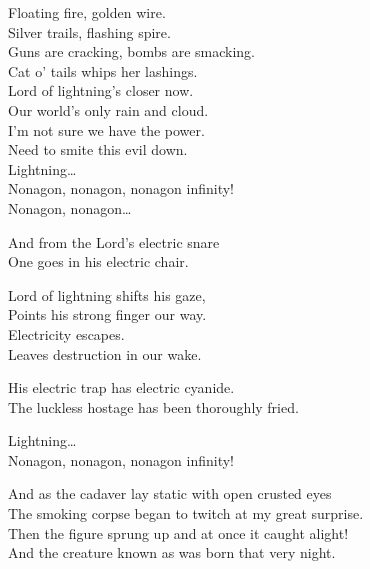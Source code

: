 
Floating fire, golden wire. \\
Silver trails, flashing spire. \\
Guns are cracking, bombs are smacking. \\
Cat o' tails whips her lashings. \\

Lord of lightning's closer now. \\
Our world's only rain and cloud. \\
I'm not sure we have the power. \\
Need to smite this evil down. \\

Lightning… \\

Nonagon, nonagon, nonagon infinity! \\
Nonagon, nonagon… \\


And from the Lord's electric snare \\
One goes in his electric chair. \\


Lord of lightning shifts his gaze, \\
Points his strong finger our way. \\
Electricity escapes. \\
Leaves destruction in our wake. \\


His electric trap has electric cyanide. \\
The luckless hostage has been thoroughly fried. \\


Lightning… \\

Nonagon, nonagon, nonagon infinity! \\


And as the cadaver lay static with open crusted eyes \\
The smoking corpse began to twitch at my great surprise. \\

Then the figure sprung up and at once it caught alight! \\
And the creature known as  was born that very night. \\

